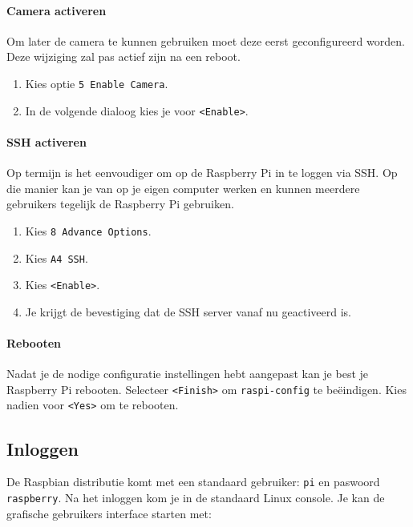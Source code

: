 \documentclass[a4paper]{article}
\begin{document}
      \paragraph{Camera activeren}
      Om later de camera te kunnen gebruiken moet deze eerst
geconfigureerd worden.  Deze wijziging zal pas actief zijn na een
reboot.

      \begin{enumerate}
        \item Kies optie \texttt{5 Enable Camera}.
        \item In de volgende dialoog kies je voor \texttt{<Enable>}.
      \end{enumerate}

      \paragraph{SSH activeren}
      Op termijn is het eenvoudiger om op de Raspberry Pi in te loggen
via SSH.  Op die manier kan je van op je eigen computer werken en
kunnen meerdere gebruikers tegelijk de Raspberry Pi gebruiken.

      \begin{enumerate}
        \item Kies \texttt{8 Advance Options}.
        \item Kies \texttt{A4 SSH}.
        \item Kies \texttt{<Enable>}.
        \item Je krijgt de bevestiging dat de SSH server vanaf nu
geactiveerd is.
      \end{enumerate}

      \paragraph{Rebooten}  Nadat je de nodige configuratie
instellingen hebt aangepast kan je best je Raspberry Pi rebooten.
Selecteer \texttt{<Finish>} om \texttt{raspi-config} te be\"eindigen.
Kies nadien voor \texttt{<Yes>} om te rebooten.

    \subsection{Inloggen}

      De Raspbian distributie komt met een standaard gebruiker:
\texttt{pi} en paswoord \texttt{raspberry}.  Na het inloggen kom je in
de standaard Linux console.  Je kan de grafische gebruikers interface
starten met:
\end{document}
